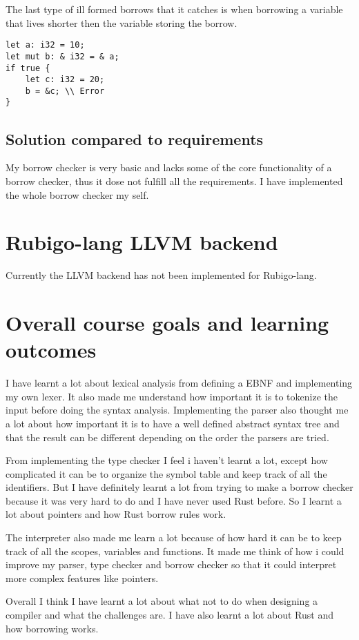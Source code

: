 \documentclass[12pt]{article}
\begin{document}
	The last type of ill formed borrows that it catches is when borrowing a variable that lives shorter then the variable storing the borrow.
	\begin{verbatim}
let a: i32 = 10;
let mut b: & i32 = & a;
if true {
    let c: i32 = 20;
    b = &c; \\ Error
}
    	\end{verbatim}


	\subsection{Solution compared to requirements}
		My borrow checker is very basic and lacks some of the core functionality of a borrow checker, thus it dose not fulfill all the requirements. I have implemented the whole borrow checker my self.  


    \section{Rubigo-lang LLVM backend}	
    	Currently the LLVM backend has not been implemented for Rubigo-lang.
	


    \section{Overall course goals and learning outcomes}
	I have learnt a lot about lexical analysis from defining a EBNF and implementing my own lexer.	It also made me understand how important it is to tokenize the input before doing the syntax analysis. Implementing the parser also thought me a lot about how important it is to have a well defined abstract syntax tree and that the result can be different depending on the order the parsers are tried.

	From implementing the type checker I feel i haven't learnt a lot, except how complicated it can be to organize the symbol table and keep track of all the identifiers. But I have definitely learnt a lot from trying to make a borrow checker because it was very hard to do and I have never used Rust before. So I learnt a lot about pointers and how Rust borrow rules work.

	The interpreter also made me learn a lot because of how hard it can be to keep track of all the scopes, variables and functions. It made me think of how i could improve my parser, type checker and borrow checker so that it could interpret more complex features like pointers.

	Overall I think I have learnt a lot about what not to do when designing a compiler and what the challenges are. I have also learnt a lot about Rust and how borrowing works.
\end{document}
